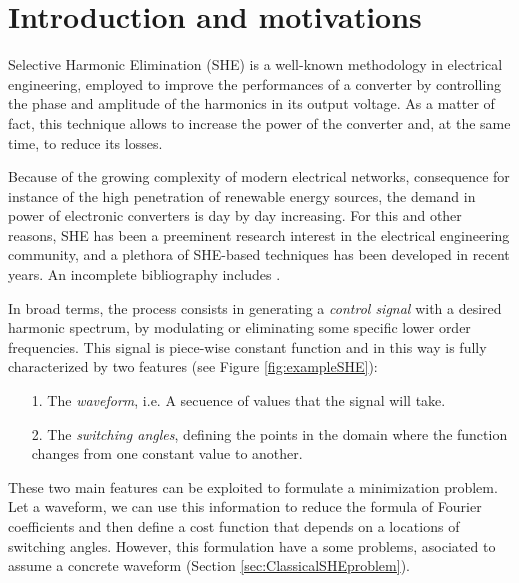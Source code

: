 \section{Introduction and motivations}\label{Section1}

Selective Harmonic Elimination (SHE) \cite{Rodriguez2002} is a well-known methodology in electrical engineering, employed to improve the performances of a converter by controlling the phase and amplitude of the harmonics in its output voltage. As a matter of fact, this technique allows to increase the power of the converter and, at the same time, to reduce its losses. 
%

Because of the growing complexity of modern electrical networks, consequence for instance of the high penetration of renewable energy sources, the demand in power of electronic converters is day by day increasing. For this and other reasons, SHE has been a preeminent research interest in the electrical engineering community, and a plethora of SHE-based techniques has been developed in recent years. An incomplete bibliography includes \cite{duranay2017selective,Janabi2020,Yang2017}.

In broad terms, the process consists in generating a \textit{control signal} with a desired harmonic spectrum, by modulating or eliminating some specific lower order frequencies. This signal is piece-wise constant function and in this way is fully characterized by two features (see Figure \ref{fig:exampleSHE}): 
\begin{itemize}
	\item[1.] The \textit{waveform}, i.e. A secuence of values that the signal will take.
	\item[2.] The \textit{switching angles}, defining the points in the domain where the function changes from one constant value to another. 
\end{itemize}
These two main features can be exploited to formulate a minimization problem. Let a waveform, we can use this information to reduce the formula of Fourier coefficients  and then define a cost function that depends on a locations of switching angles. However, this formulation have a some problems, asociated to assume a concrete waveform (Section \ref{sec:ClassicalSHEproblem}).  



